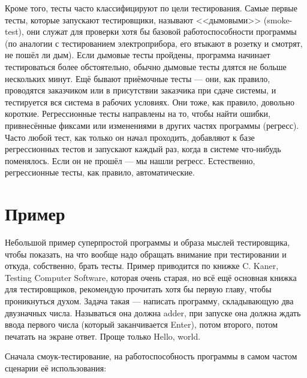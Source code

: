 \documentclass{../../text-style}
\begin{document}
Кроме того, тесты часто классифицируют по цели тестирования. Самые первые тесты, которые запускают тестировщики, называют <<дымовыми>> (smoke-test), они служат для проверки хотя бы базовой работоспособности программы (по аналогии с тестированием электроприбора, его втыкают в розетку и смотрят, не пошёл ли дым). Если дымовые тесты пройдены, программа начинает тестироваться более обстоятельно, обычно дымовые тесты длятся не больше нескольких минут. Ещё бывают приёмочные тесты --- они, как правило, проводятся заказчиком или в присутствии заказчика при сдаче системы, и тестируется вся система в рабочих условиях. Они тоже, как правило, довольно короткие. Регрессионные тесты направлены на то, чтобы найти ошибки, привнесённые фиксами или изменениями в других частях программы (регресс). Часто любой тест, как только он начал проходить, добавляют к базе регрессионных тестов и запускают каждый раз, когда в системе что-нибудь поменялось. Если он не прошёл --- мы нашли регресс. Естественно, регрессионные тесты, как правило, автоматические.

\section{Пример}

Небольшой пример суперпростой программы и образа мыслей тестировщика, чтобы показать, на что вообще надо обращать внимание при тестировании и откуда, собственно, брать тесты. Пример приводится по книжке C. Kaner, Testing Computer Software, которая очень старая, но всё ещё основная книжка для тестировщиков, рекомендую прочитать хотя бы первую главу, чтобы проникнуться духом. Задача такая --- написать программу, складывающую два двузначных числа. Называться она должна adder, при запуске она должна ждать ввода первого числа (который заканчивается Enter), потом второго, потом печатать на экране ответ. Проще только Hello, world.

Сначала смоук-тестирование, на работоспособность программы в самом частом сценарии её использования: 
\end{document}

